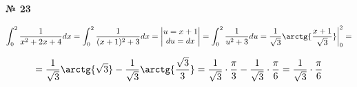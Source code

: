 \documentclass{article}
\begin{document}
\textbf{№ 23} 

$$ \int_{0}^{2} \frac{1}{x^2+2x+4} dx 
= \int_{0}^{2} \frac{1}{(x+1)^2+3} dx 
= \begin{vmatrix} u = x+1 \\
                 du = dx \end{vmatrix} 
= \int_{0}^{2} \frac{1}{u^2+3} du 
= \frac{1}{\sqrt{3}} \arctg{\frac{x+1}{\sqrt{3}}} \bigg\vert_{0}^{2} 
= $$

$$ = \frac{1}{\sqrt{3}} \arctg{\sqrt{3}} - \frac{1}{\sqrt{3}} \arctg{\frac{\sqrt{3}}{3}}
= \frac{1}{\sqrt{3}} \cdot \frac{\pi}{3} - \frac{1}{\sqrt{3}} \cdot \frac{\pi}{6} 
= \frac{1}{\sqrt{3}} \cdot \frac{\pi}{6} $$
\end{document}
